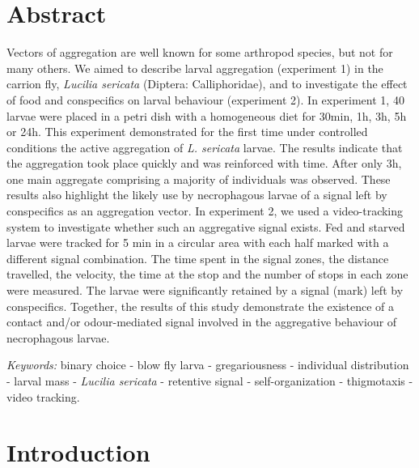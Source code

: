 
\section{Abstract}

Vectors of aggregation are well known for some arthropod species, but not for many others. We aimed to describe larval aggregation (experiment 1) in the carrion fly, \textit{Lucilia sericata} (Diptera: Calliphoridae), and to investigate the effect of food and conspecifics on larval behaviour (experiment 2). In experiment 1, 40 larvae were placed in a petri dish with a homogeneous diet for 30min, 1h, 3h, 5h or 24h. This experiment demonstrated for the first time under controlled conditions the active aggregation of \emph{L. sericata} larvae. The results indicate that the aggregation took place quickly and was reinforced with time. After only 3h, one main aggregate comprising a majority of individuals was observed. These results also highlight the likely use by necrophagous larvae of a signal left by conspecifics as an aggregation vector. In experiment 2, we used a video-tracking system to investigate whether such an aggregative signal exists. Fed and starved larvae were tracked for 5 min in a circular area with each half marked with a different signal combination. The time spent in the signal zones, the distance travelled, the velocity, the time at the stop and the number of stops in each zone were measured. The larvae were significantly retained by a signal (mark) left by conspecifics. Together, the results of this study demonstrate the existence of a contact and/or odour-mediated signal involved in the aggregative behaviour of necrophagous larvae.

\emph{Keywords:} binary choice - blow fly larva - gregariousness - individual distribution - larval mass - \textit{Lucilia sericata} - retentive signal - self-organization - thigmotaxis - video tracking.

\clearpage

\section{Introduction}

